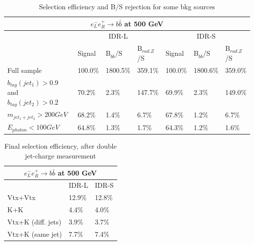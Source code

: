 \documentclass[preprint]{elsarticle}
\begin{document}
\begin{itemize}
\begin{table}[t]
  \begin{center}\renewcommand{\arraystretch}{1.6}
    \begin{tabular}{l|l|l|l|l|l|l} 
    \multicolumn{7}{c}{$e_{L}^{-}e_{R}^{+}\rightarrow b\bar{b}$ at 500 GeV }\\
      \hline
      \hline
       & \multicolumn{3}{c|}{IDR-L} & \multicolumn{3}{|c}{IDR-S}\\
       & Signal& B$_{b\bar{b}}$/S & B$_{rad. Z}$/S & Signal & B$_{b\bar{b}}$/S & B$_{rad. Z}$/S\\
      \hline
      Full sample   & 100.0\% & 1800.5\% & 359.1\% & 100.0\% & 1800.6\% & 359.0\% \\
      $b_{tag}(jet_{1})>0.9$ and $b_{tag}(jet_{2})>0.2$    & 70.2\% & 2.3\% & 147.7\%  & 69.9\% & 2.3\% & 149.0\% \\
      $m_{jet_{1}+jet_{2}}>200 GeV$    & 68.2\% & 1.4\% & 6.7\%  & 67.8\% & 1.2\% & 6.7\% \\
      $E_{photon}<100 GeV$    & 64.8\% & 1.3\% & 1.7\% & 64.3\% & 1.2\% & 1.6\% \\
      \hline
      \hline     
    \end{tabular}
 \end{center}
 \label{table_eff_bbbar}
 \caption{Selection efficiency and B/S rejection for some bkg sources}
\end{table}

\begin{table}[t]
  \begin{center}\renewcommand{\arraystretch}{1.6}
    \begin{tabular}{l|l|l} 
    \multicolumn{3}{c}{$e_{L}^{-}e_{R}^{+}\rightarrow b\bar{b}$ at 500 GeV }\\
      \hline
      \hline
       & IDR-L & IDR-S\\
      \hline
      Vtx+Vtx   & 12.9\% & 12.8\% \\
      K+K    & 4.4\% & 4.0\% \\
      Vtx+K (diff. jets)    & 3.9\% & 3.7\% \\
      Vtx+K (same jet) & 7.7\% & 7.4\% \\
      \hline
      \hline     
    \end{tabular}
 \end{center}
 \label{table_charge_calc_bbbar}
 \caption{Final selection efficiency, after double jet-charge measurement}
\end{table}
    

\end{itemize}
\end{document}

